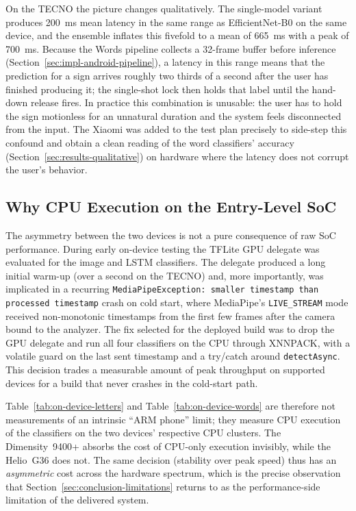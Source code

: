 On the TECNO the picture changes qualitatively. The single-model
variant produces \SI{200}{ms} mean latency in the same range as
EfficientNet-B0 on the same device, and the ensemble inflates this
fivefold to a mean of \SI{665}{ms} with a peak of \SI{700}{ms}.
Because the Words pipeline collects a 32-frame buffer before
inference (Section~\ref{sec:impl-android-pipeline}), a latency in
this range means that the prediction for a sign arrives roughly two
thirds of a second after the user has finished producing it; the
single-shot lock then holds that label until the hand-down release
fires. In practice this combination is unusable: the user has to
hold the sign motionless for an unnatural duration and the system
feels disconnected from the input. The Xiaomi was added to the test
plan precisely to side-step this confound and obtain a clean reading
of the word classifiers' accuracy (Section~\ref{sec:results-qualitative})
on hardware where the latency does not corrupt the user's behavior.

\subsection{Why CPU Execution on the Entry-Level SoC}
\label{sec:results-on-device-cpu}

The asymmetry between the two devices is not a pure consequence of
raw SoC performance. During early on-device testing the TFLite GPU
delegate was evaluated for the image and LSTM classifiers. The
delegate produced a long initial warm-up (over a second on the
TECNO) and, more importantly, was implicated in a recurring
\texttt{MediaPipeException: smaller timestamp than processed
timestamp} crash on cold start, where MediaPipe's
\texttt{LIVE\_STREAM} mode received non-monotonic timestamps from
the first few frames after the camera bound to the analyzer. The
fix selected for the deployed build was to drop the GPU delegate
and run all four classifiers on the CPU through XNNPACK, with a
volatile guard on the last sent timestamp and a try/catch around
\texttt{detectAsync}. This decision trades a measurable amount of
peak throughput on supported devices for a build that never crashes
in the cold-start path.

Table~\ref{tab:on-device-letters} and
Table~\ref{tab:on-device-words} are therefore not measurements of an
intrinsic ``ARM phone'' limit; they measure CPU execution of the
classifiers on the two devices' respective CPU clusters. The
Dimensity~9400+ absorbs the cost of CPU-only execution invisibly,
while the Helio~G36 does not. The same decision (stability over
peak speed) thus has an \emph{asymmetric} cost across the hardware
spectrum, which is the precise observation that
Section~\ref{sec:conclusion-limitations} returns to as the
performance-side limitation of the delivered system.

